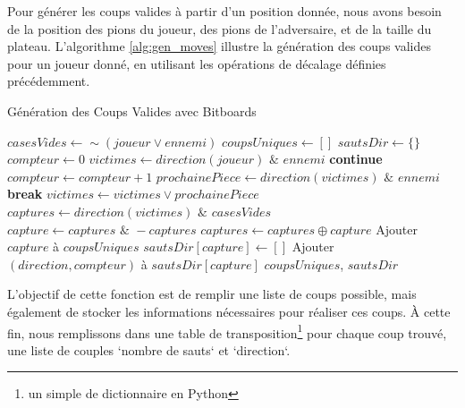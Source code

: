 Pour générer les coups valides à partir d'un position donnée, nous avons besoin de la position des pions du joueur, des pions de l'adversaire, et de la taille du plateau. L'algorithme \ref{alg:gen_moves} illustre la génération des coups valides pour un joueur donné, en utilisant les opérations de décalage définies précédemment.
\begin{algorithm}[H]
    \caption{Génération des Coups Valides avec Bitboards}
    \begin{algorithmic}[1]
        \State $casesVides \gets \sim(joueur \lor ennemi)$
        \State $coupsUniques \gets []$
        \State $sautsDir \gets \{\}$
            \State $compteur \gets 0$
            \State $victimes \gets direction(joueur) \,\, \& \,\, ennemi$
                \State \textbf{continue}
            \EndIf
                \State $compteur \gets compteur + 1$
                \State $prochainePiece \gets direction(victimes) \,\, \& \,\, ennemi$
                    \State \textbf{break}
                \EndIf
                \State $victimes \gets victimes \lor prochainePiece$
            \EndFor
            \State $captures \gets direction(victimes) \,\, \& \,\, casesVides$
                \State $capture \gets captures \,\, \& \,\, -captures$
                \State $captures \gets captures \oplus capture$
                    \State Ajouter $capture$ à $coupsUniques$
                    \State $sautsDir[capture] \gets []$
                \EndIf
                \State Ajouter $(direction, compteur)$ à $sautsDir[capture]$
            \EndWhile
        \EndFor
        \State \Return $coupsUniques$, $sautsDir$
    \EndFunction
    \end{algorithmic}
    \label{alg:gen_moves}
\end{algorithm}

L'objectif de cette fonction est de remplir une liste de coups possible, mais également de stocker les informations nécessaires pour réaliser ces coups. À cette fin, nous remplissons dans une table de transposition\footnote{un simple de dictionnaire en Python} pour chaque coup trouvé, une liste de couples `nombre de sauts` et `direction`. 


